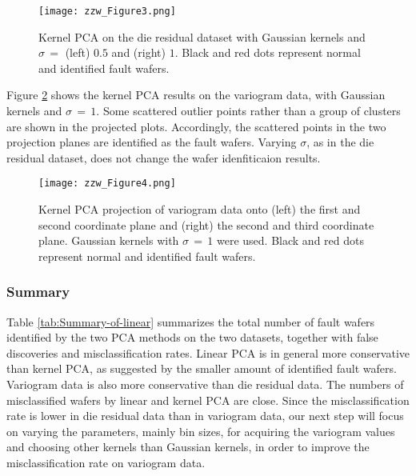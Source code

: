 \documentclass[12pt]{article}
\numberwithin{equation}{section}
\numberwithin{table}{section}
\numberwithin{figure}{section}
\begin{document}
\begin{figure}[!tph]
\begin{centering}
\texttt{[image: zzw\_Figure3.png]}
\par\end{centering}

\caption{Kernel PCA on the die residual dataset with Gaussian kernels and $\sigma\,=$
(left) $0.5$ and (right) $1$. Black and red dots represent normal
and identified fault wafers.\label{fig:3}}
\end{figure}


Figure \ref{fig:4} shows the kernel PCA results on the variogram
data, with Gaussian kernels and $\sigma\,=\,1$. Some scattered outlier
points rather than a group of clusters are shown in the projected
plots. Accordingly, the scattered points in the two projection planes
are identified as the fault wafers. Varying $\sigma$, as in the die
residual dataset, does not change the wafer idenfiticaion results.

\begin{figure}[!tph]
\begin{centering}
\texttt{[image: zzw\_Figure4.png]}
\par\end{centering}

\caption{Kernel PCA projection of variogram data onto (left) the first and
second coordinate plane and (right) the second and third coordinate
plane. Gaussian kernels with $\sigma\,=\,1$ were used. Black and
red dots represent normal and identified fault wafers.\label{fig:4}}
\end{figure}



\subsubsection{Summary}

Table \ref{tab:Summary-of-linear} summarizes the total number of
fault wafers identified by the two PCA methods on the two datasets,
together with false discoveries and misclassification rates. Linear
PCA is in general more conservative than kernel PCA, as suggested
by the smaller amount of identified fault wafers. Variogram data is
also more conservative than die residual data. The numbers of misclassified
wafers by linear and kernel PCA are close. Since the misclassification
rate is lower in die residual data than in variogram data, our next
step will focus on varying the parameters, mainly bin sizes, for acquiring
the variogram values and choosing other kernels than Gaussian kernels,
in order to improve the misclassification rate on variogram data.
\end{document}
